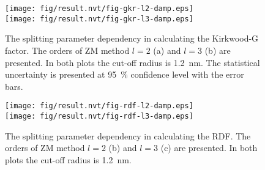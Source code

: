 \documentclass[aip,jcp,a4paper,reprint,unsortedaddress,onecolumn,fleqn]{revtex4}
\begin{document}
\begin{figure}[tbp]
\centering
\texttt{[image: fig/result.nvt/fig-gkr-l2-damp.eps]}\\
\texttt{[image: fig/result.nvt/fig-gkr-l3-damp.eps]}
\caption{  The 
  splitting parameter dependency in calculating the Kirkwood-G factor.
  The orders of ZM method $l=2$ (a)  and $l=3$ (b) are presented.
  In both plots the cut-off radius is 1.2~nm. The
  statistical uncertainty is presented at 95~\% confidence level with the
  error bars. }
\label{fig:gkr-conv-alpha}
\end{figure}


\begin{figure}[tbp]
\centering
\texttt{[image: fig/result.nvt/fig-rdf-l2-damp.eps]}\\
\texttt{[image: fig/result.nvt/fig-rdf-l3-damp.eps]}
\caption{  The 
  splitting parameter dependency in calculating the RDF.
  The orders of ZM method  $l=2$ (b)  and $l=3$ (c) are presented.
  In both plots the cut-off radius is 1.2~nm. }
\label{fig:gkr-conv-alpha}
\end{figure}


\newpage 

{}

\end{document}
